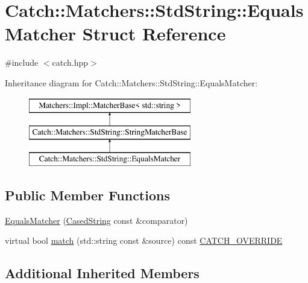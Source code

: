 \hypertarget{structCatch_1_1Matchers_1_1StdString_1_1EqualsMatcher}{\section{Catch\-:\-:Matchers\-:\-:Std\-String\-:\-:Equals\-Matcher Struct Reference}
\label{structCatch_1_1Matchers_1_1StdString_1_1EqualsMatcher}
}


{\ttfamily \#include $<$catch.\-hpp$>$}

Inheritance diagram for Catch\-:\-:Matchers\-:\-:Std\-String\-:\-:Equals\-Matcher\-:\begin{figure}[H]
\begin{center}
\leavevmode
\includegraphics[height=3.000000cm]{structCatch_1_1Matchers_1_1StdString_1_1EqualsMatcher}
\end{center}
\end{figure}
\subsection*{Public Member Functions}
\begin{DoxyCompactItemize}
\item 
\hyperlink{structCatch_1_1Matchers_1_1StdString_1_1EqualsMatcher_ab740f1fb2310e9fe3fed5134d4c7e4c8}{Equals\-Matcher} (\hyperlink{structCatch_1_1Matchers_1_1StdString_1_1CasedString}{Cased\-String} const \&comparator)
\item 
virtual bool \hyperlink{structCatch_1_1Matchers_1_1StdString_1_1EqualsMatcher_a2aeaac3c0efb8422643cd1b155256213}{match} (std\-::string const \&source) const \hyperlink{catch_8hpp_a8ecdce4d3f57835f707915ae831eb847}{C\-A\-T\-C\-H\-\_\-\-O\-V\-E\-R\-R\-I\-D\-E}
\end{DoxyCompactItemize}
\subsection*{Additional Inherited Members}


